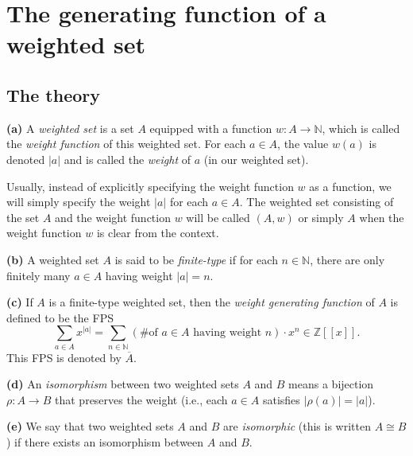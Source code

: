 \section{The generating function of a weighted set}

\subsection{The theory}

\begin{definition}
\label{def.gf-ws.weighted-sets}
\leantarget
\leanok
\textbf{(a)} A \emph{weighted set} is a set $A$
equipped with a function $w:A\rightarrow\mathbb{N}$, which is called the
\emph{weight function} of this weighted set. For each $a\in A$, the value
$w\left(  a\right)  $ is denoted $\left\vert a\right\vert $ and is called the
\emph{weight} of $a$ (in our weighted set). \medskip

Usually, instead of explicitly specifying the weight function $w$ as a
function, we will simply specify the weight $\left\vert a\right\vert $ for
each $a\in A$. The weighted set consisting of the set $A$ and the weight
function $w$ will be called $\left(  A,w\right)  $ or simply $A$ when the
weight function $w$ is clear from the context. \medskip

\textbf{(b)} A weighted set $A$ is said to be \emph{finite-type} if for each
$n\in\mathbb{N}$, there are only finitely many $a\in A$ having weight
$\left\vert a\right\vert =n$. \medskip

\textbf{(c)} If $A$ is a finite-type weighted set, then the \emph{weight
generating function} of $A$ is defined to be the FPS%
\[
\sum_{a\in A}x^{\left\vert a\right\vert }=\sum_{n\in\mathbb{N}}\left(
\text{\# of }a\in A\text{ having weight }n\right)  \cdot x^{n}\in
\mathbb{Z}\left[  \left[  x\right]  \right]  .
\]
This FPS is denoted by $\overline{A}$. \medskip

\textbf{(d)} An \emph{isomorphism} between two weighted sets $A$ and $B$ means
a bijection $\rho:A\rightarrow B$ that preserves the weight (i.e., each $a\in
A$ satisfies $\left\vert \rho\left(  a\right)  \right\vert =\left\vert
a\right\vert $). \medskip

\textbf{(e)} We say that two weighted sets $A$ and $B$ are \emph{isomorphic}
(this is written $A\cong B$) if there exists an isomorphism between $A$ and
$B$.
\end{definition}

